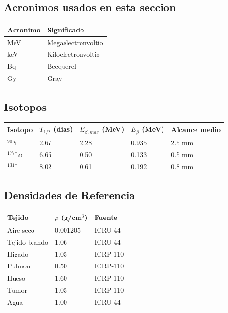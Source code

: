 \documentclass[12pt,a4paper]{article}
\begin{document}
\subsection*{Acronimos usados en esta seccion}
\begin{tabular}{ll}
\toprule
\textbf{Acronimo} & \textbf{Significado} \\
\midrule
MeV & Megaelectronvoltio \\
keV & Kiloelectronvoltio \\
Bq & Becquerel \\
Gy & Gray \\
\bottomrule
\end{tabular}

\subsection{Isotopos}

\begin{center}
\begin{tabular}{lllll}
\toprule
\textbf{Isotopo} & $T_{1/2}$ (dias) & $E_{\beta,max}$ (MeV) & $\bar{E}_\beta$ (MeV) & \textbf{Alcance medio} \\
\midrule
$^{90}$Y & 2.67 & 2.28 & 0.935 & 2.5 mm \\
$^{177}$Lu & 6.65 & 0.50 & 0.133 & 0.5 mm \\
$^{131}$I & 8.02 & 0.61 & 0.192 & 0.8 mm \\
\bottomrule
\end{tabular}
\end{center}

\subsection{Densidades de Referencia}

\begin{center}
\begin{tabular}{lll}
\toprule
\textbf{Tejido} & $\rho$ (g/cm$^3$) & \textbf{Fuente} \\
\midrule
Aire seco & 0.001205 & ICRU-44 \\
Tejido blando & 1.06 & ICRU-44 \\
Higado & 1.05 & ICRP-110 \\
Pulmon & 0.50 & ICRP-110 \\
Hueso & 1.60 & ICRP-110 \\
Tumor & 1.05 & ICRP-110 \\
Agua & 1.00 & ICRU-44 \\
\bottomrule
\end{tabular}
\end{center}
\end{document}
